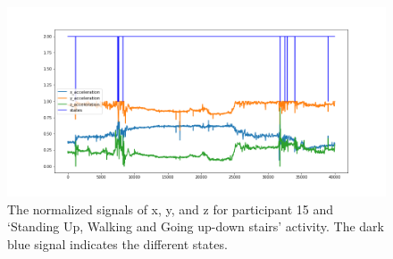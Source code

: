\begin{figure}[H]
    \centering
    \begin{minipage}[b]{1\textwidth}
        \includegraphics[width=\textwidth]{manuscript/src/figures/Ass3/Ass3_Q2_states_user_14N.png}
    \end{minipage}
    \caption{The normalized signals of x, y, and z for participant 15 and ‘Standing  Up,  Walking  and  Going  up-down  stairs’ activity. The dark blue signal indicates the different states.}
    \label{fig:Ass3_Q2_states_user_14N}
\end{figure}






